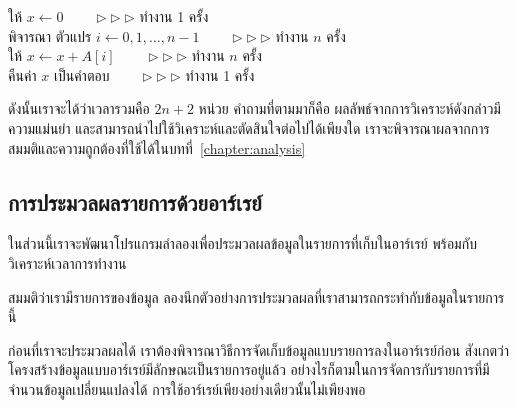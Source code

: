 \begin{algt}
\noindent \hspace*{0.2in} ให้ $x\leftarrow 0$   \ \ \ \ $\rhd\rhd\rhd$ ทำงาน 1 ครั้ง\\
\hspace*{0.2in} พิจารณา ตัวแปร $i\leftarrow 0,1,\ldots,n-1$  \ \ \ \ $\rhd\rhd\rhd$ ทำงาน $n$ ครั้ง\\
\hspace*{0.2in}\hspace*{0.2in} ให้ $x \leftarrow x + A[i]$  \ \ \ \ $\rhd\rhd\rhd$ ทำงาน $n$ ครั้ง\\
\hspace*{0.2in} คืน{\wbr}ค่า $x$ เป็น{\wbr}คำตอบ  \ \ \ \ $\rhd\rhd\rhd$ ทำงาน 1 ครั้ง{\wbr}
\end{algt}

ดังนั้น{\wbr}เรา{\wbr}จะ{\wbr}ได้{\wbr}ว่า{\wbr}เวลา{\wbr}รวม{\wbr}คือ $2n + 2$ หน่วย คำถาม{\wbr}ที่{\wbr}ตาม{\wbr}มา{\wbr}ก็{\wbr}คือ{\wbr}
ผลลัพธ์{\wbr}จาก{\wbr}การ{\wbr}วิเคราะห์{\wbr}ดังกล่าว{\wbr}มี{\wbr}ความ{\wbr}แม่นยำ{\wbr}
และ{\wbr}สามารถ{\wbr}นำ{\wbr}ไป{\wbr}ใช้{\wbr}วิเคราะห์{\wbr}และ{\wbr}ตัดสินใจ{\wbr}ต่อไป{\wbr}ได้{\wbr}เพียงใด{\wbr}
เรา{\wbr}จะ{\wbr}พิจารณา{\wbr}ผล{\wbr}จาก{\wbr}การ{\wbr}สมมติ{\wbr}และ{\wbr}ความ{\wbr}ถูกต้อง{\wbr}ที่{\wbr}ใช้ได้{\wbr}ใน{\wbr}บท{\wbr}ที่~\ref{chapter:analysis}

\subsection{การ{\wbr}ประมวลผล{\wbr}รายการ{\wbr}ด้วย{\wbr}อาร์เรย์}

ใน{\wbr}ส่วน{\wbr}นี้{\wbr}เรา{\wbr}จะ{\wbr}พัฒนา{\wbr}โปรแกรม{\wbr}ลำ{\wbr}ลอง{\wbr}เพื่อ{\wbr}ประมวลผล{\wbr}ข้อมูล{\wbr}ใน{\wbr}รายการ{\wbr}ที่{\wbr}เก็บ{\wbr}ใน{\wbr}อาร์เรย์
พร้อมกับ{\wbr}วิเคราะห์{\wbr}เวลา{\wbr}การ{\wbr}ทำงาน{\wbr}

\begin{quiz}{}
สมมติ{\wbr}ว่า{\wbr}เรา{\wbr}มี{\wbr}รายการ{\wbr}ของ{\wbr}ข้อมูล ลอง{\wbr}นึก{\wbr}ตัวอย่าง{\wbr}การ{\wbr}ประมวลผล{\wbr}ที่{\wbr}เรา{\wbr}สามารถ{\wbr}กระทำ{\wbr}กับ{\wbr}ข้อมูล{\wbr}ใน{\wbr}รายการ{\wbr}นี้{\wbr}
\end{quiz}

ก่อน{\wbr}ที่{\wbr}เรา{\wbr}จะ{\wbr}ประมวลผล{\wbr}ได้ เรา{\wbr}ต้อง{\wbr}พิจารณา{\wbr}วิธีการ{\wbr}จัด{\wbr}เก็บ{\wbr}ข้อมูล{\wbr}แบบ{\wbr}รายการ{\wbr}ลง{\wbr}ใน{\wbr}อาร์เรย์{\wbr}ก่อน{\wbr}
สังเกต{\wbr}ว่า{\wbr}โครงสร้าง{\wbr}ข้อมูล{\wbr}แบบ{\wbr}อาร์เรย์{\wbr}มี{\wbr}ลักษณะ{\wbr}เป็น{\wbr}รายการ{\wbr}อยู่{\wbr}แล้ว{\wbr}
อย่างไรก็ตาม{\wbr}ใน{\wbr}การ{\wbr}จัดการ{\wbr}กับ{\wbr}รายการ{\wbr}ที่{\wbr}มี{\wbr}จำนวน{\wbr}ข้อมูล{\wbr}เปลี่ยนแปลง{\wbr}ได้{\wbr}
การ{\wbr}ใช้{\wbr}อาร์เรย์{\wbr}เพียง{\wbr}อย่างเดียว{\wbr}นั้น{\wbr}ไม่{\wbr}เพียงพอ{\wbr}

